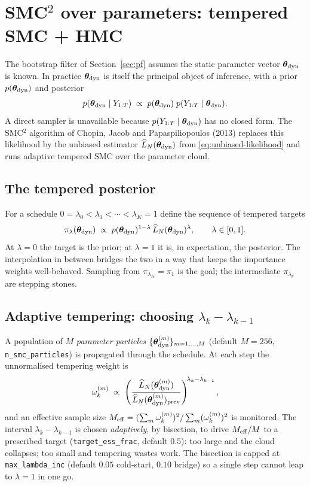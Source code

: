 \section{SMC$^2$ over parameters: tempered SMC + HMC} \label{sec:smc2}

The bootstrap filter of Section~\ref{sec:pf} assumes the static
parameter vector $\bm{\theta}_{\rm dyn}$ is known. In practice $\bm{\theta}_{\rm dyn}$ is
itself the principal object of inference, with a prior $p(\bm{\theta}_{\rm dyn})$
and posterior
\begin{equation}
p(\bm{\theta}_{\rm dyn} \mid Y_{1:T})
   \;\propto\; p(\bm{\theta}_{\rm dyn})\;p(Y_{1:T} \mid \bm{\theta}_{\rm dyn}).
\end{equation}
A direct sampler is unavailable because $p(Y_{1:T} \mid \bm{\theta}_{\rm dyn})$ has
no closed form. The SMC$^2$ algorithm of Chopin, Jacob and
Papaspiliopoulos (2013) replaces this likelihood by the unbiased
estimator $\widehat{L}_N(\bm{\theta}_{\rm dyn})$ from \eqref{eq:unbiased-likelihood} and
runs adaptive tempered SMC over the parameter cloud.

\subsection{The tempered posterior}

For a schedule $0 = \lambda_0 < \lambda_1 < \cdots < \lambda_K = 1$
define the sequence of tempered targets
\begin{equation}
\pi_\lambda(\bm{\theta}_{\rm dyn}) \;\propto\;
   p(\bm{\theta}_{\rm dyn})^{1-\lambda}\,\widehat{L}_N(\bm{\theta}_{\rm dyn})^{\lambda},
   \qquad \lambda \in [0, 1].
\label{eq:tempered-target}
\end{equation}
At $\lambda = 0$ the target is the prior; at $\lambda = 1$ it is, in
expectation, the posterior. The interpolation in between bridges the
two in a way that keeps the importance weights well-behaved. Sampling
from $\pi_{\lambda_K} = \pi_1$ is the goal; the intermediate
$\pi_{\lambda_k}$ are stepping stones.

\subsection{Adaptive tempering: choosing $\lambda_k - \lambda_{k-1}$}

A population of $M$ \emph{parameter particles}
$\{\bm{\theta}_{\rm dyn}^{(m)}\}_{m=1, \ldots, M}$ (default $M = 256$,
\texttt{n\_smc\_particles}) is propagated through the schedule. At
each step the unnormalised tempering weight is
\begin{equation}
\omega_k^{(m)} \;\propto\;
   \left(\frac{\widehat{L}_N(\bm{\theta}_{\rm dyn}^{(m)})}
              {\widehat{L}_N(\bm{\theta}_{\rm dyn}^{(m)})_{\rm prev}}\right)^{\!\lambda_k - \lambda_{k-1}},
\end{equation}
and an effective sample size
$M_{\rm eff} = (\sum_m \omega_k^{(m)})^2 / \sum_m (\omega_k^{(m)})^2$
is monitored. The interval $\lambda_k - \lambda_{k-1}$ is chosen
\emph{adaptively}, by bisection, to drive $M_{\rm eff} / M$ to a
prescribed target (\texttt{target\_ess\_frac}, default $0.5$): too
large and the cloud collapses; too small and tempering wastes work.
The bisection is capped at \texttt{max\_lambda\_inc} (default $0.05$
cold-start, $0.10$ bridge) so a single step cannot leap to $\lambda =
1$ in one go.

